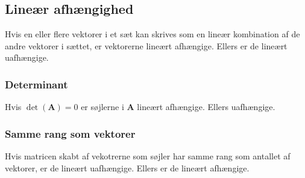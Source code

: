 \subsection{Lineær afhængighed}
Hvis en eller flere vektorer i et sæt kan skrives som en lineær kombination af de andre vektorer i sættet, er vektorerne lineært afhængige. Ellers er de lineært uafhængige.

\subsubsection{Determinant}
Hvis $\det(\mathbf{A}) = 0$ er søjlerne i $\mathbf{A}$ lineært afhængige. Ellers uafhængige.


\subsubsection{Samme rang som vektorer}
Hvis matricen skabt af vekotrerne som søjler har samme rang som antallet af vektorer, er de lineært uafhængige. Ellers er de lineært afhængige.

